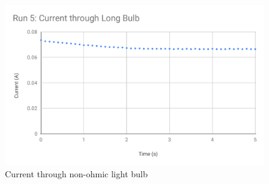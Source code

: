 %
\begin{figure}[ht]
	\centering
	\includegraphics[scale=0.74]{image/03-serial-parallel/bulb-I.pdf}
	\caption{Current through non-ohmic light bulb}
	\label{figure.03.bulb.i}
\end{figure}